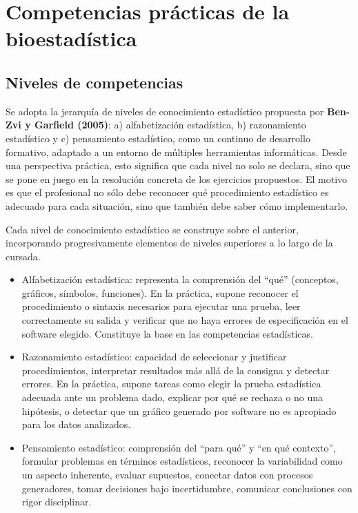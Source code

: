 \documentclass[
  spanish,
  letterpaper,
  DIV=11,
  numbers=noendperiod]{scrreprt}
\begin{document}

\chapter{Competencias prácticas de la
bioestadística}\label{competencias-pruxe1cticas-de-la-bioestaduxedstica}

\section{Niveles de competencias}\label{niveles-de-competencias}

Se adopta la jerarquía de niveles de conocimiento estadístico propuesta
por \textbf{Ben-Zvi y Garfield (2005)}: a) alfabetización estadística,
b) razonamiento estadístico y c) pensamiento estadístico, como un
continuo de desarrollo formativo, adaptado a un entorno de múltiples
herramientas informáticas. Desde una perspectiva práctica, esto
significa que cada nivel no solo se declara, sino que se pone en juego
en la resolución concreta de los ejercicios propuestos. El motivo es que
el profesional no sólo debe reconocer qué procedimiento estadístico es
adecuado para cada situación, sino que también debe saber cómo
implementarlo.

Cada nivel de conocimiento estadístico se construye sobre el anterior,
incorporando progresivamente elementos de niveles superiores a lo largo
de la cursada.

\begin{itemize}
\item
  Alfabetización estadística: representa la comprensión del ``qué''
  (conceptos, gráficos, símbolos, funciones). En la práctica, supone
  reconocer el procedimiento o sintaxis necesarios para ejecutar una
  prueba, leer correctamente su salida y verificar que no haya errores
  de especificación en el software elegido. Constituye la base en las
  competencias estadísticas.
\item
  Razonamiento estadístico: capacidad de seleccionar y justificar
  procedimientos, interpretar resultados más allá de la consigna y
  detectar errores. En la práctica, supone tareas como elegir la prueba
  estadística adecuada ante un problema dado, explicar por qué se
  rechaza o no una hipótesis, o detectar que un gráfico generado por
  software no es apropiado para los datos analizados.
\item
  Pensamiento estadístico: comprensión del ``para qué'' y ``en qué
  contexto'', formular problemas en términos estadísticos, reconocer la
  variabilidad como un aspecto inherente, evaluar supuestos, conectar
  datos con procesos generadores, tomar decisiones bajo incertidumbre,
  comunicar conclusiones con rigor disciplinar.
\end{itemize}
\end{document}
